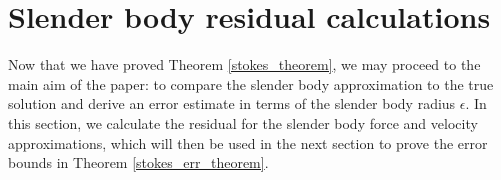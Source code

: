 \documentclass[11pt]{article}
\numberwithin{equation}{section}
\newcommand{\T}{\mathbb{T}}
\newcommand{\bu}{\bm{u}}
\newcommand{\bv}{\bm{v}}
\newcommand{\ts}{\thinspace}
\newcommand{\dive}{{\rm{div}}}
\theoremstyle{definition}
\begin{document}
%
%
%
%


\section{Slender body residual calculations}\label{residual_calc}
Now that we have proved Theorem \ref{stokes_theorem}, we may proceed to the main aim of the paper: to compare the slender body approximation to the true solution and derive an error estimate in terms of the slender body radius $\epsilon$. In this section, we calculate the residual for the slender body force and velocity approximations, which will then be used in the next section to prove the error bounds in Theorem \ref{stokes_err_theorem}. 
\end{document}
